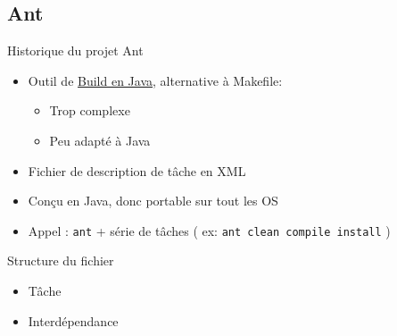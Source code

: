 \documentclass[handout]{beamer}
\begin{document}
\subsection{Ant}
\begin{frame}
	\begin{block}{Historique du projet Ant}
		\begin{itemize}
			\item Outil de \underline{Build en Java}, alternative à Makefile:
				\begin{itemize}
				 	\item Trop complexe
					\item Peu adapté à Java
				\end{itemize}
			\item Fichier de description de tâche en XML
			\item Conçu en Java, donc portable sur tout les OS
			\item Appel : \texttt{ant} + série de tâches ( ex: \texttt{ant clean compile install} )
		\end{itemize}
	 \end{block}
\end{frame}



\begin{frame}
	\begin{block}{Structure du fichier}
			\begin{itemize}
				\item Tâche
				\item Interdépendance
			\end{itemize}
	\end{block}
	

\end{frame}
\end{document}
